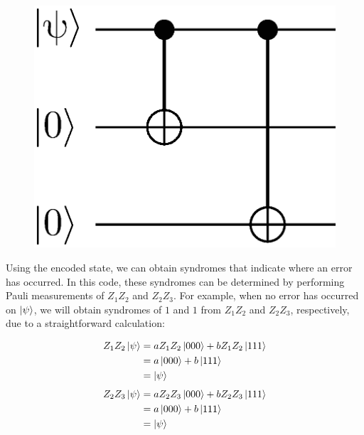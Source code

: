 \documentclass[a4paper,11pt]{ltjsarticle}
\begin{document}
{{{            \begin{figure}[h]
                \centering
                \includegraphics[scale=0.40]{figure/encoding_repetition.eps}
                \vspace{-40pt}\caption{}
                \label{encoding_repetition}
                \vspace{-15pt}
            \end{figure}

            Using the encoded state, we can obtain syndromes that indicate where an error has occurred. In this code, these syndromes can be determined by performing Pauli measurements of $Z_1 Z_2$ and $Z_2 Z_3$. For example, when no error has occurred on \(\ket{\psi}\), we will obtain syndromes of $1$ and $1$ from $Z_1 Z_2$ and $Z_2 Z_3$, respectively, due to a straightforward calculation:
            
            \begin{align*}
                Z_1Z_2\ket{\psi} &= aZ_1Z_2\ket{000}+bZ_1Z_2\ket{111}\\
                &= a\ket{000}+b\ket{111}\\
                &= \ket{\psi}
            \end{align*}
            \begin{align*}
                Z_2 Z_3\ket{\psi} &= aZ_2Z_3\ket{000}+bZ_2Z_3\ket{111}\\
                &= a\ket{000}+b\ket{111}\\
                &= \ket{\psi}
            \end{align*}

}}}
\end{document}
